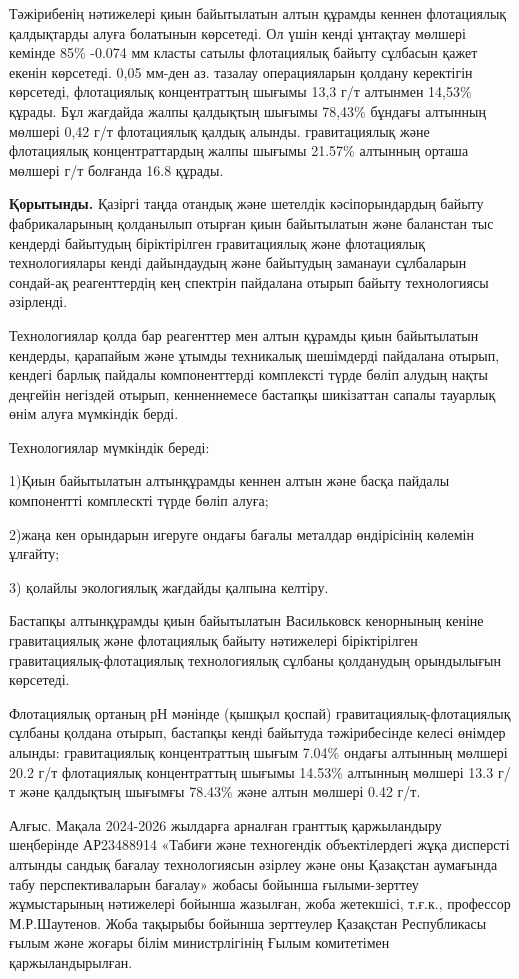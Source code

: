 \begin{multicols}{2}

Тәжірибенің нәтижелері қиын байытылатын алтын құрамды кеннен флотациялық
қалдықтарды алуға болатынын көрсетеді. Ол үшін кенді ұнтақтау мөлшері
кемінде 85\% -0.074 мм класты сатылы флотациялық байыту сұлбасын қажет
екенін көрсетеді. 0,05 мм-ден аз. тазалау операцияларын қолдану
керектігін көрсетеді, флотациялық концентраттың шығымы 13,3 г/т алтынмен
14,53\% құрады. Бұл жағдайда жалпы қалдықтың шығымы 78,43\% бұндағы
алтынның мөлшері 0,42 г/т флотациялық қалдық алынды. гравитациялық және
флотациялық концентраттардың жалпы шығымы 21.57\% алтынның орташа
мөлшері г/т болғанда 16.8 құрады.

{\bfseries Қорытынды.} Қазіргі таңда отандық және шетелдік кәсіпорындардың
байыту фабрикаларының қолданылып отырған қиын байытылатын және баланстан
тыс кендерді байытудың біріктірілген гравитациялық және флотациялық
технологиялары кенді дайындаудың және байытудың заманауи сұлбаларын
сондай-ақ реагенттердің кең спектрін пайдалана отырып байыту
технологиясы әзірленді.

Технологиялар қолда бар реагенттер мен алтын құрамды қиын байытылатын
кендерды, қарапайым және ұтымды техникалық шешімдерді пайдалана отырып,
кендегі барлық пайдалы компоненттерді комплексті түрде бөліп алудың
нақты деңгейін негіздей отырып, кенненнемесе бастапқы шикізаттан сапалы
тауарлық өнім алуға мүмкіндік берді.

Технологиялар мүмкіндік береді:

1)Қиын байытылатын алтынқұрамды кеннен алтын және басқа пайдалы
компонентті комплескті түрде бөліп алуға;

2)жаңа кен орындарын игеруге ондағы бағалы металдар өндірісінің көлемін
ұлғайту;

3) қолайлы экологиялық жағдайды қалпына келтіру.

Бастапқы алтынқұрамды қиын байытылатын Васильковск кенорнының кеніне
гравитациялық және флотациялық байыту нәтижелері біріктірілген
гравитациялық-флотациялық технологиялық сұлбаны қолданудың орындылығын
көрсетеді.

Флотациялық ортаның рН мәнінде (қышқыл қоспай) гравитациялық-флотациялық
сұлбаны қолдана отырып, бастапқы кенді байытуда тәжірибесінде келесі
өнімдер алынды: гравитациялық концентраттың шығым 7.04\% ондағы алтынның
мөлшері 20.2 г/т флотациялық концентраттың шығымы 14.53\% алтынның
мөлшері 13.3 г/т және қалдықтың шығымғы 78.43\% және алтын мөлшері 0.42
г/т.

Алғыс. Мақала 2024-2026 жылдарға арналған гранттық қаржыландыру
шеңберінде АР23488914 «Табиғи және техногендік объектілердегі жұқа
дисперсті алтынды сандық бағалау технологиясын әзірлеу және оны
Қазақстан аумағында табу перспективаларын бағалау» жобасы бойынша
ғылыми-зерттеу жұмыстарының нәтижелері бойынша жазылған, жоба жетекшісі,
т.ғ.к., профессор М.Р.Шаутенов. Жоба тақырыбы бойынша зерттеулер
Қазақстан Республикасы ғылым және жоғары білім министрлігінің Ғылым
комитетімен қаржыландырылған.
\end{multicols}


